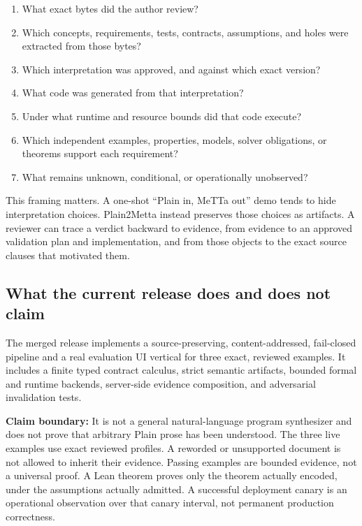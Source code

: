 \documentclass[11pt]{article}
\newcommand{\boundary}{\textbf{Claim boundary: }}
\begin{document}
\begin{enumerate}
\item What exact bytes did the author review?
\item Which concepts, requirements, tests, contracts, assumptions, and holes
      were extracted from those bytes?
\item Which interpretation was approved, and against which exact version?
\item What code was generated from that interpretation?
\item Under what runtime and resource bounds did that code execute?
\item Which independent examples, properties, models, solver obligations, or
      theorems support each requirement?
\item What remains unknown, conditional, or operationally unobserved?
\end{enumerate}

This framing matters.  A one-shot ``Plain in, MeTTa out'' demo tends to hide
interpretation choices.  Plain2Metta instead preserves those choices as
artifacts.  A reviewer can trace a verdict backward to evidence, from evidence
to an approved validation plan and implementation, and from those objects to
the exact source clauses that motivated them.

\subsection{What the current release does and does not claim}

The merged release implements a source-preserving, content-addressed,
fail-closed pipeline and a real evaluation UI vertical for three exact,
reviewed examples.  It includes a finite typed contract calculus, strict
semantic artifacts, bounded formal and runtime backends, server-side evidence
composition, and adversarial invalidation tests.

\boundary It is not a general natural-language program synthesizer and does
not prove that arbitrary Plain prose has been understood.  The three live
examples use exact reviewed profiles.  A reworded or unsupported document is
not allowed to inherit their evidence.  Passing examples are bounded evidence,
not a universal proof.  A Lean theorem proves only the theorem actually
encoded, under the assumptions actually admitted.  A successful deployment
canary is an operational observation over that canary interval, not permanent
production correctness.
\end{document}
